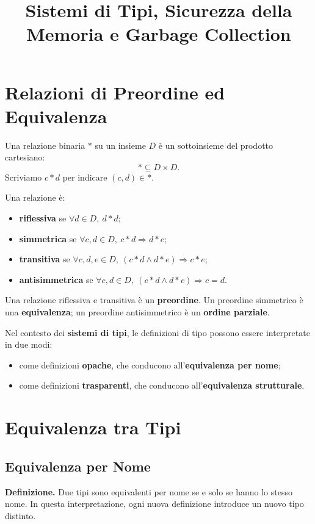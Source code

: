 \documentclass{article}
\title{Sistemi di Tipi, Sicurezza della Memoria e Garbage Collection}
\author{}
\date{}
\begin{document}
\maketitle

\section{Relazioni di Preordine ed Equivalenza}

Una relazione binaria $*$ su un insieme $D$ è un sottoinsieme del prodotto cartesiano:
\[
* \subseteq D \times D.
\]
Scriviamo $c * d$ per indicare $(c,d) \in *$.

Una relazione è:
\begin{itemize}
  \item \textbf{riflessiva} se $\forall d \in D,\ d*d$;
  \item \textbf{simmetrica} se $\forall c,d \in D,\ c*d \Rightarrow d*c$;
  \item \textbf{transitiva} se $\forall c,d,e \in D,\ (c*d \land d*e) \Rightarrow c*e$;
  \item \textbf{antisimmetrica} se $\forall c,d \in D,\ (c*d \land d*c) \Rightarrow c=d$.
\end{itemize}

Una relazione riflessiva e transitiva è un \textbf{preordine}. Un preordine simmetrico è una \textbf{equivalenza}; un preordine antisimmetrico è un \textbf{ordine parziale}.

Nel contesto dei \textbf{sistemi di tipi}, le definizioni di tipo possono essere interpretate in due modi:
\begin{itemize}
  \item come definizioni \textbf{opache}, che conducono all'\textbf{equivalenza per nome};
  \item come definizioni \textbf{trasparenti}, che conducono all'\textbf{equivalenza strutturale}.
\end{itemize}

\section{Equivalenza tra Tipi}

\subsection{Equivalenza per Nome}

\textbf{Definizione.} Due tipi sono equivalenti per nome se e solo se hanno lo stesso nome. In questa interpretazione, ogni nuova definizione introduce un nuovo tipo distinto.
\end{document}

